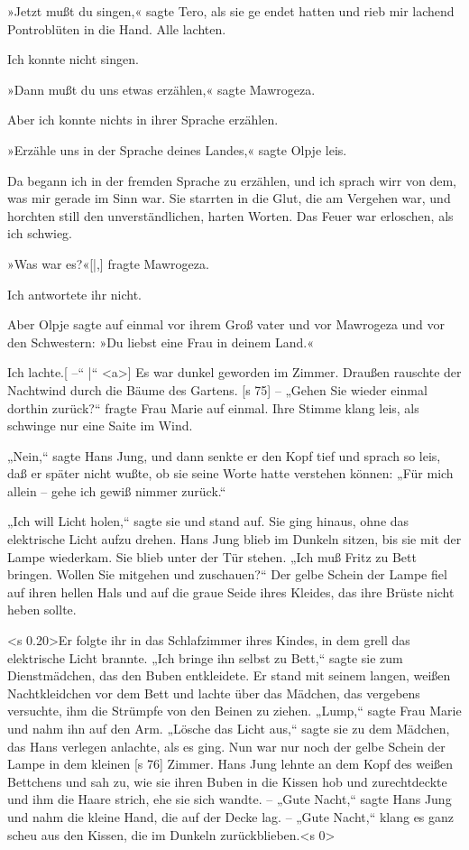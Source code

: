 »Jetzt mußt du singen,« sagte Tero, als sie ge­
endet hatten und rieb mir lachend Pontroblüten in
die Hand. Alle lachten.

Ich konnte nicht singen.

»Dann mußt du uns etwas erzählen,« sagte
Mawrogeza.

Aber ich konnte nichts in ihrer Sprache erzählen.

»Erzähle uns in der Sprache deines Landes,«
sagte Olpje leis.

Da begann ich in der fremden Sprache zu erzählen,
und ich sprach wirr von dem, was mir gerade im Sinn
war. Sie starrten in die Glut, die am Vergehen war,
und horchten still den unverständlichen, harten Worten.
Das Feuer war erloschen, als ich schwieg.

»Was war es?«[|,] fragte Mawrogeza.

Ich antwortete ihr nicht.

Aber Olpje sagte auf einmal vor ihrem Groß­
vater und vor Mawrogeza und vor den Schwestern:
»Du liebst eine Frau in deinem Land.«

Ich lachte.[ –“
|“
<a>]
Es war dunkel geworden im Zimmer. Draußen
rauschte der Nachtwind durch die Bäume des Gartens.
[s 75]
– „Gehen Sie wieder einmal dorthin zurück?“ fragte
Frau Marie auf einmal. Ihre Stimme klang leis, als
schwinge nur eine Saite im Wind.

„Nein,“ sagte Hans Jung, und dann senkte er
den Kopf tief und sprach so leis, daß er später nicht
wußte, ob sie seine Worte hatte verstehen können:
„Für mich allein – gehe ich gewiß nimmer zurück.“

„Ich will Licht holen,“ sagte sie und stand auf.
Sie ging hinaus, ohne das elektrische Licht aufzu­
drehen. Hans Jung blieb im Dunkeln sitzen, bis sie
mit der Lampe wiederkam. Sie blieb unter der Tür
stehen. „Ich muß Fritz zu Bett bringen. Wollen
Sie mitgehen und zuschauen?“ Der gelbe Schein der
Lampe fiel auf ihren hellen Hals und auf die graue
Seide ihres Kleides, das ihre Brüste nicht heben sollte.

<s 0.20>Er folgte ihr in das Schlafzimmer ihres Kindes,
in dem grell das elektrische Licht brannte. „Ich bringe
ihn selbst zu Bett,“ sagte sie zum Dienstmädchen,
das den Buben entkleidete. Er stand mit seinem
langen, weißen Nachtkleidchen vor dem Bett und
lachte über das Mädchen, das vergebens versuchte,
ihm die Strümpfe von den Beinen zu ziehen. „Lump,“
sagte Frau Marie und nahm ihn auf den Arm.
„Lösche das Licht aus,“ sagte sie zu dem Mädchen,
das Hans verlegen anlachte, als es ging. Nun war
nur noch der gelbe Schein der Lampe in dem kleinen
[s 76]
Zimmer. Hans Jung lehnte an dem Kopf des weißen
Bettchens und sah zu, wie sie ihren Buben in die
Kissen hob und zurechtdeckte und ihm die Haare
strich, ehe sie sich wandte. – „Gute Nacht,“ sagte
Hans Jung und nahm die kleine Hand, die auf der
Decke lag. – „Gute Nacht,“ klang es ganz scheu
aus den Kissen, die im Dunkeln zurückblieben.<s 0>

